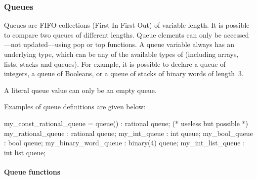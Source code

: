 \subsubsection{Queues}

Queues are FIFO collections (First In First Out) of variable length.
It is possible to compare two queues of different lengths.
Queue elements can only be accessed---not updated---using pop or top functions.
A queue variable always has an underlying type, which can be any of the available types of \imitator{} (including arrays, lists, stacks and queues).
For example, it is possible to declare a queue of integers, a queue of Booleans, or a queue of stacks of binary words of length~3.

\begin{remark}
A literal queue value can only be an empty queue.
\end{remark}

Examples of queue definitions are given below:

\begin{IMITATORmodel}
	my_const_rational_queue = queue() : rational queue; (* useless but possible *)
	my_rational_queue			: rational queue;
	my_int_queue					: int queue;
	my_bool_queue        	: bool queue;
	my_binary_word_queue 	: binary(4) queue;
	my_int_list_queue     : int list queue;
\end{IMITATORmodel}


\paragraph{Queue functions}

